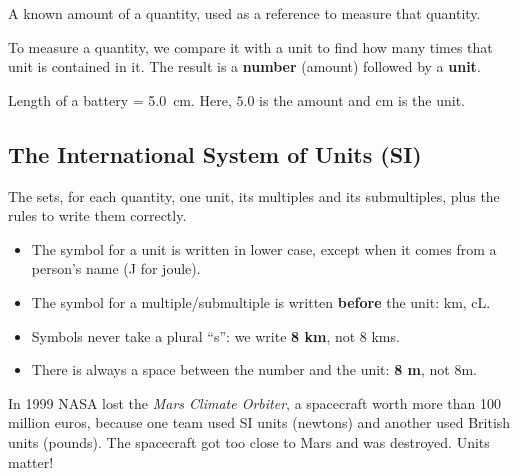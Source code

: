 \begin{definition}[Unit]
    A known amount of a quantity, used as a reference to measure that quantity.
\end{definition}


To measure a quantity, we compare it with a unit to find how many times that unit is contained in it. The result is a \textbf{number} (amount) followed by a \textbf{unit}.

\begin{example}
    Length of a battery = \qty{5.0}{\cm}. Here, \(\num{5.0}\) is the amount and \(\unit{\cm}\) is the unit.
\end{example}

\subsection{The International System of Units (SI)}

The  sets, for each quantity, one unit, its multiples and its submultiples, plus the rules to write them correctly.

\begin{itemize}
    \item The symbol for a unit is written in lower case, except when it comes from a person's name (J for joule).
    \item The symbol for a multiple/submultiple is written \textbf{before} the unit: km, cL.
    \item Symbols never take a plural ``s'': we write \textbf{8 km}, not 8 kms.
    \item There is always a space between the number and the unit: \textbf{8 m}, not 8m.
\end{itemize}

\begin{didyouknow}
    In 1999 NASA lost the \emph{Mars Climate Orbiter}, a spacecraft worth more than 100 million euros, because one team used SI units (newtons) and another used British units (pounds). The spacecraft got too close to Mars and was destroyed. Units matter!
\end{didyouknow}


